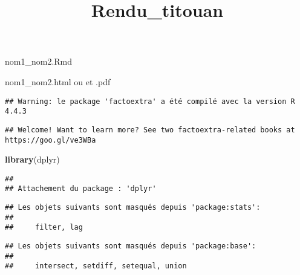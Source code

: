 \documentclass[
]{article}
\title{Rendu\_titouan}
\author{}
\date{\vspace{-2.5em}}
\newenvironment{Shaded}{\begin{snugshade}}{\end{snugshade}}
\newcommand{\AttributeTok}[1]{\textcolor[rgb]{0.13,0.29,0.53}{#1}}
\newcommand{\ConstantTok}[1]{\textcolor[rgb]{0.56,0.35,0.01}{#1}}
\newcommand{\FunctionTok}[1]{\textcolor[rgb]{0.13,0.29,0.53}{\textbf{#1}}}
\newcommand{\NormalTok}[1]{#1}
\newcommand{\SpecialCharTok}[1]{\textcolor[rgb]{0.81,0.36,0.00}{\textbf{#1}}}
\begin{document}
\maketitle

nom1\_nom2.Rmd

nom1\_nom2.html ou et .pdf

\begin{Shaded}
\end{Shaded}

\begin{verbatim}
## Warning: le package 'factoextra' a été compilé avec la version R 4.4.3
\end{verbatim}

\begin{verbatim}
## Welcome! Want to learn more? See two factoextra-related books at https://goo.gl/ve3WBa
\end{verbatim}

\begin{Shaded}
\begin{Highlighting}[]
\FunctionTok{library}\NormalTok{(dplyr)}
\end{Highlighting}
\end{Shaded}

\begin{verbatim}
## 
## Attachement du package : 'dplyr'
\end{verbatim}

\begin{verbatim}
## Les objets suivants sont masqués depuis 'package:stats':
## 
##     filter, lag
\end{verbatim}

\begin{verbatim}
## Les objets suivants sont masqués depuis 'package:base':
## 
##     intersect, setdiff, setequal, union
\end{verbatim}
\end{document}
